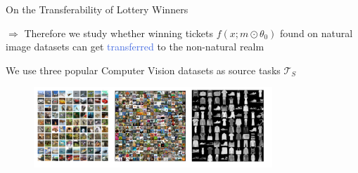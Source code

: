 \documentclass{beamer}
\begin{document}
\begin{frame}{On the Transferability of Lottery Winners}

	$\Rightarrow$ Therefore we study whether winning tickets $f(x;m \odot \theta_0)$
	found on natural image datasets can get \textcolor{RoyalBlue}{transferred} to the non-natural realm

	\bigskip

	We use three popular Computer Vision datasets as source tasks $\mathcal{T}_S$

	\begin{figure}
 \includegraphics[width=0.8\textwidth]{figures/fashion_mnist}
\end{figure}
\end{frame}
\end{document}
